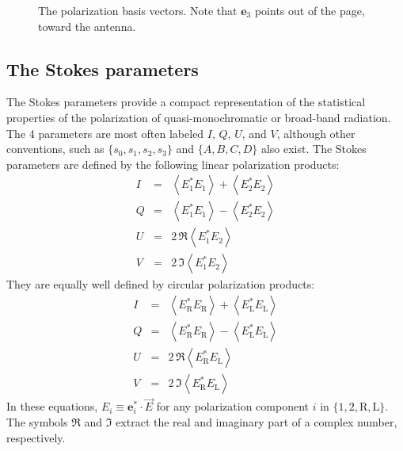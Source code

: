 \documentclass{article}
\begin{document}
\begin{figure}[hb]
\begin{center}
\end{center}
\caption{\label{fig:polcoords}The polarization basis vectors.  Note that 
$\mathbf{e}_3$ points out of the page, toward the antenna.}
\end{figure}

\subsection{The Stokes parameters}

The Stokes parameters provide a compact representation of the statistical
properties of the polarization of quasi-monochromatic or broad-band 
radiation.  The 4 parameters are most often labeled $I$, $Q$, $U$, and $V$,
although other conventions, such as $\{s_0, s_1, s_2, s_3\}$ and 
$\{A, B, C, D\}$ also exist.
The Stokes parameters are defined by the following linear polarization products:
\begin{eqnarray}
I & = & \left<E_1^* E_1\right> + \left<E_2^* E_2\right> \\
Q & = & \left<E_1^* E_1\right> - \left<E_2^* E_2\right> \\
U & = & 2 \, \Re \left<E_1^* E_2\right> \\
V & = & 2 \, \Im \left<E_1^* E_2\right> 
\end{eqnarray}
They are equally well defined by circular polarization products:
\begin{eqnarray}
I & = & \left<E_\mathrm{R}^* E_\mathrm{R}\right> + 
	\left<E_\mathrm{L}^* E_\mathrm{L}\right> \\
Q & = & \left<E_\mathrm{R}^* E_\mathrm{R}\right> - 
	\left<E_\mathrm{L}^* E_\mathrm{L}\right> \\
U & = & 2 \, \Re \left<E_\mathrm{R}^* E_\mathrm{L}\right> \\
V & = & 2 \, \Im \left<E_\mathrm{R}^* E_\mathrm{L}\right> 
\end{eqnarray}
In these equations, $E_i \equiv \mathbf{e}_i^* \cdot \vec{E}$ for 
any polarization component $i$ in $\{1, 2, \mathrm{R}, \mathrm{L}\}$.  The
symbols $\Re$ and $\Im$ extract the real and imaginary part of a 
complex number, respectively.
\end{document}
